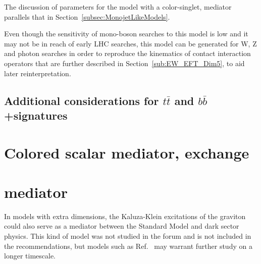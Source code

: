 The discussion of parameters for the model with a color-singlet, \spinzero mediator
parallels that in Section~\ref{subsec:MonojetLikeModels}. 

Even though the sensitivity of mono-boson searches to this model is low and it may not
be in reach of early LHC searches, this model can be generated for W, Z and photon searches 
in order to reproduce the kinematics of contact interaction operators that are further 
described in Section~\ref{sub:EW_EFT_Dim5}, to aid later reinterpretation.  

%

\subsection{\texorpdfstring{Additional considerations for $t \bar{t}$ and $b \bar{b}$+\MET signatures}{Additional considerations for ttbar/bbbar+\MET signatures}}
\label{subsec:DMHFModels}



\section{Colored scalar mediator, \tchannel exchange}
\label{sec:monojet_t_channel}


\section{ \Spintwo mediator}
\label{sec:spintwo}

In models with extra dimensions, the Kaluza-Klein excitations of the graviton could also serve as a mediator between the Standard Model and dark sector physics. This kind of model was not studied in the forum and is not included in the recommendations, but models such as Ref.~\cite{Lee:2013bua} may warrant further study on a longer timescale. 


